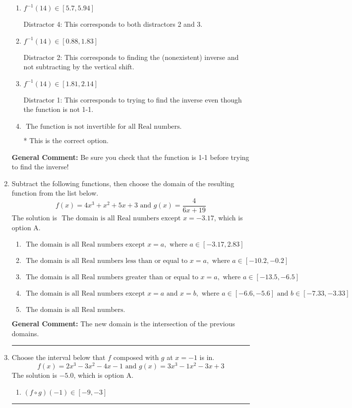 \documentclass{extbook}[14pt]
\newcommand{\litem}[1]{\item #1

\rule{\textwidth}{0.4pt}}
\begin{document}
\begin{enumerate}
{\begin{enumerate}[label=\Alph*.]
 Distractor 3: This corresponds to finding the (nonexistent) inverse and dividing by a negative.
\item \( f^{-1}(14) \in [5.7, 5.94] \)

 Distractor 4: This corresponds to both distractors 2 and 3.
\item \( f^{-1}(14) \in [0.88, 1.83] \)

 Distractor 2: This corresponds to finding the (nonexistent) inverse and not subtracting by the vertical shift.
\item \( f^{-1}(14) \in [1.81, 2.14] \)

 Distractor 1: This corresponds to trying to find the inverse even though the function is not 1-1. 
\item \( \text{ The function is not invertible for all Real numbers. } \)

* This is the correct option.
\end{enumerate}

\textbf{General Comment:} Be sure you check that the function is 1-1 before trying to find the inverse!
}
\litem{
Subtract the following functions, then choose the domain of the resulting function from the list below.
\[ f(x) = 4x^{3} + x^{2} +5 x + 3 \text{ and } g(x) = \frac{4}{6x+19} \]The solution is \( \text{ The domain is all Real numbers except } x = -3.17 \), which is option A.\begin{enumerate}[label=\Alph*.]
\item \( \text{ The domain is all Real numbers except } x = a, \text{ where } a \in [-3.17, 2.83] \)


\item \( \text{ The domain is all Real numbers less than or equal to } x = a, \text{ where } a \in [-10.2, -0.2] \)


\item \( \text{ The domain is all Real numbers greater than or equal to } x = a, \text{ where } a \in [-13.5, -6.5] \)


\item \( \text{ The domain is all Real numbers except } x = a \text{ and } x = b, \text{ where } a \in [-6.6, -5.6] \text{ and } b \in [-7.33, -3.33] \)


\item \( \text{ The domain is all Real numbers. } \)


\end{enumerate}

\textbf{General Comment:} The new domain is the intersection of the previous domains.
}
\litem{
Choose the interval below that $f$ composed with $g$ at $x=-1$ is in.
\[ f(x) = 2x^{3} -3 x^{2} -4 x -1 \text{ and } g(x) = 3x^{3} -1 x^{2} -3 x + 3 \]The solution is \( -5.0 \), which is option A.\begin{enumerate}[label=\Alph*.]
\item \( (f \circ g)(-1) \in [-9, -3] \)


\end{enumerate}}
\end{enumerate}
\end{document}
